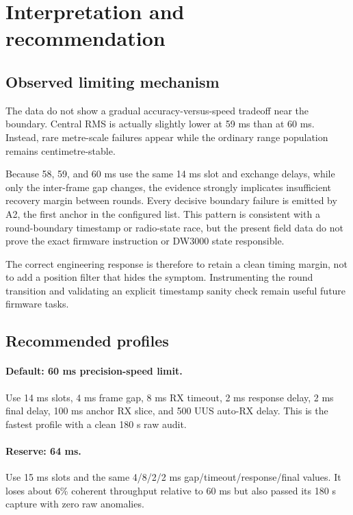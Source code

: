 \documentclass[11pt,a4paper]{article}
\begin{document}
\section{Interpretation and recommendation}

\subsection{Observed limiting mechanism}

The data do not show a gradual accuracy-versus-speed tradeoff near the
boundary. Central RMS is actually slightly lower at 59 ms than at 60 ms.
Instead, rare metre-scale failures appear while the ordinary range population
remains centimetre-stable.

Because 58, 59, and 60 ms use the same 14 ms slot and exchange delays, while
only the inter-frame gap changes, the evidence strongly implicates insufficient
recovery margin between rounds. Every decisive boundary failure is emitted by
A2, the first anchor in the configured list. This pattern is consistent with a
round-boundary timestamp or radio-state race, but the present field data do
not prove the exact firmware instruction or DW3000 state responsible.

The correct engineering response is therefore to retain a clean timing margin,
not to add a position filter that hides the symptom. Instrumenting the
round transition and validating an explicit timestamp sanity check remain
useful future firmware tasks.

\subsection{Recommended profiles}

\paragraph{Default: 60 ms precision-speed limit.}
Use 14 ms slots, 4 ms frame gap, 8 ms RX timeout, 2 ms response delay, 2 ms
final delay, 100 ms anchor RX slice, and 500 UUS auto-RX delay. This is the
fastest profile with a clean 180 s raw audit.

\paragraph{Reserve: 64 ms.}
Use 15 ms slots and the same 4/8/2/2 ms gap/timeout/response/final values.
It loses about 6\% coherent throughput relative to 60 ms but also passed its
180 s capture with zero raw anomalies.
\end{document}
